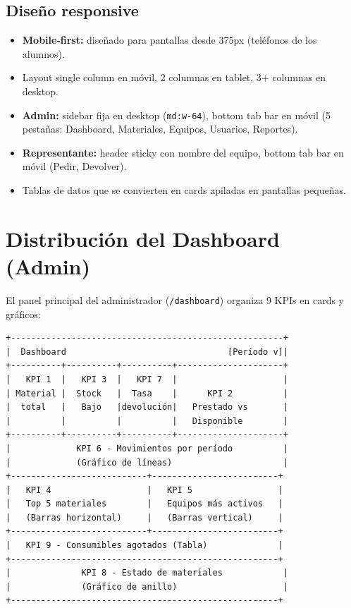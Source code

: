 \documentclass[12pt,a4paper,oneside]{report}
\newcommand{\file}[1]{\texttt{\color{cecyteDark}#1}}
\begin{document}
\subsection{Diseño responsive}

\begin{itemize}
  \item \textbf{Mobile-first:} diseñado para pantallas desde 375px (teléfonos de los alumnos).
  \item Layout single column en móvil, 2 columnas en tablet, 3+ columnas en desktop.
  \item \textbf{Admin:} sidebar fija en desktop (\file{md:w-64}), bottom tab bar en móvil (5 pestañas: Dashboard, Materiales, Equipos, Usuarios, Reportes).
  \item \textbf{Representante:} header sticky con nombre del equipo, bottom tab bar en móvil (Pedir, Devolver).
  \item Tablas de datos que se convierten en cards apiladas en pantallas pequeñas.
\end{itemize}

\section{Distribución del Dashboard (Admin)}

El panel principal del administrador (\file{/dashboard}) organiza 9 KPIs en cards y gráficos:

\begin{verbatim}
+------------------------------------------------------+
|  Dashboard                                [Período v]|
+----------+----------+----------+---------------------+
|   KPI 1  |   KPI 3  |   KPI 7  |                     |
| Material |  Stock   |  Tasa    |      KPI 2          |
|  total   |   Bajo   |devolución|   Prestado vs       |
|          |          |          |   Disponible        |
+----------+----------+----------+---------------------+
|             KPI 6 - Movimientos por período          |
|             (Gráfico de líneas)                      |
+---------------------------+-------------------------+
|   KPI 4                   |   KPI 5                 |
|   Top 5 materiales        |   Equipos más activos   |
|   (Barras horizontal)     |   (Barras vertical)     |
+---------------------------+-------------------------+
|   KPI 9 - Consumibles agotados (Tabla)              |
+-----------------------------------------------------+
|              KPI 8 - Estado de materiales            |
|              (Gráfico de anillo)                     |
+-----------------------------------------------------+
\end{verbatim}
\end{document}
